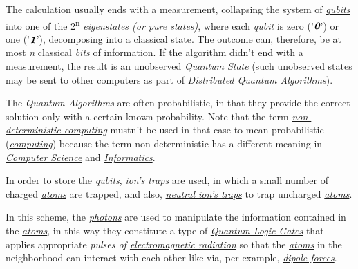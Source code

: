 \documentclass[conference]{IEEEtran}
\begin{document}
 \vspace{4pt}
 
 The calculation usually ends with a measurement, collapsing the system of \href{https://en.wikipedia.org/wiki/Qubit}{\textit{qubits}} into one of the 2\textsuperscript{n} \href{https://en.wikipedia.org/wiki/Quantum_state#Pure_states}{\textit{eigenstates (or pure states)}}, where each \href{https://en.wikipedia.org/wiki/Qubit}{\textit{qubit}} is zero ('$\textit{\textbf{0}}$') or one ('$\textit{\textbf{1}}$'), decomposing into a classical state. The outcome can, therefore, be at most \textit{n} classical \href{https://en.wikipedia.org/wiki/Bit}{\textit{bits}} of information. If the algorithm didn't end with a measurement, the result is an unobserved \href{https://en.wikipedia.org/wiki/Quantum_state}{\textit{Quantum State}} (such unobserved states may be sent to other computers as part of \textit{Distributed Quantum Algorithms}).

\vspace{4pt}

The \textit{Quantum Algorithms} are often probabilistic, in that they provide the correct solution only with a certain known probability. Note that the term \href{https://en.wikipedia.org/wiki/Non-deterministic_Turing_machine}{\textit{non-deterministic computing}} mustn't be used in that case to mean probabilistic (\href{https://en.wikipedia.org/wiki/Computing}{\textit{computing}}) because the term non-deterministic has a different meaning in \href{https://en.wikipedia.org/wiki/Computer_science}{\textit{Computer Science}} and \href{https://en.wikipedia.org/wiki/Informatics}{\textit{Informatics}}.

\vspace{4pt}

In order to store the \href{https://en.wikipedia.org/wiki/Qubit}{\textit{qubits}}, \href{https://en.wikipedia.org/wiki/Ion_trap}{\textit{ion's traps}} are used, in which a small number of charged \href{https://en.wikipedia.org/wiki/Atom}{\textit{atoms}} are trapped, and also, \href{https://en.wikipedia.org/wiki/Magnetic_trap_(atoms)}{\textit{neutral ion's traps}} to trap uncharged \href{https://en.wikipedia.org/wiki/Atom}{\textit{atoms}}.

\vspace{4pt}

In this scheme, the \href{https://en.wikipedia.org/wiki/Photon}{\textit{photons}} are used to manipulate the information contained in the \href{https://en.wikipedia.org/wiki/Atom}{\textit{atoms}}, in this way they constitute a type of \href{https://en.wikipedia.org/wiki/Quantum_logic_gate}{\textit{Quantum Logic Gates}} that applies appropriate \textit{pulses of \href{https://en.wikipedia.org/wiki/Electromagnetic_radiation}{electromagnetic radiation}} so that the \href{https://en.wikipedia.org/wiki/Atom}{\textit{atoms}} in the neighborhood can interact with each other like via, per example, \href{https://en.wikipedia.org/wiki/Intermolecular_force}{\textit{dipole forces}}.
\end{document}

